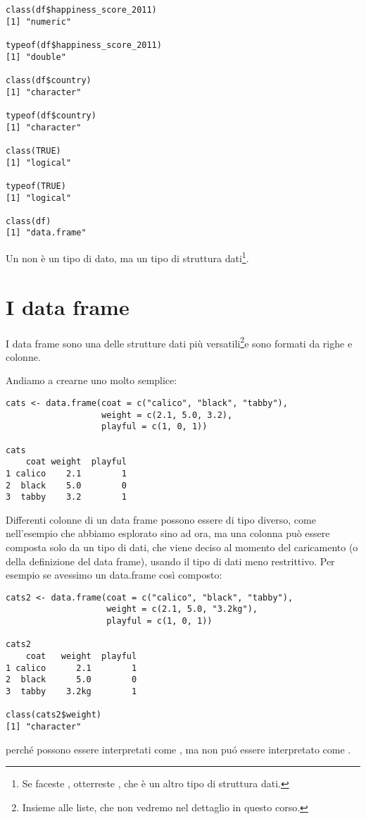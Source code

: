 \begin{lstlisting}[style=Rstyle]	
class(df$happiness_score_2011)
[1] "numeric"

typeof(df$happiness_score_2011)
[1] "double"

class(df$country)
[1] "character"

typeof(df$country)
[1] "character"

class(TRUE)
[1] "logical"

typeof(TRUE)
[1] "logical"

class(df)
[1] "data.frame"
\end{lstlisting}
%
Un  non \`e un tipo di dato, ma un tipo di struttura dati\footnote{Se faceste , otterreste , che \`e un altro tipo di struttura dati.}.

\section{I data frame}

I data frame sono una delle strutture dati pi\`u versatili\footnote{Insieme alle liste, che non vedremo nel dettaglio in questo corso.}e sono formati da righe e colonne.

\noindent Andiamo a crearne uno molto semplice:

\begin{lstlisting}[style=Rstyle]
cats <- data.frame(coat = c("calico", "black", "tabby"),
                   weight = c(2.1, 5.0, 3.2),
                   playful = c(1, 0, 1))
				   
cats					
    coat weight  playful
1 calico    2.1        1
2  black    5.0        0
3  tabby    3.2        1
\end{lstlisting}

\vspace{0.2cm}

\noindent Differenti colonne di un data frame possono essere di tipo diverso, come nell'esempio che abbiamo esplorato sino ad ora, ma una colonna pu\`o essere composta solo da un tipo di dati, che viene deciso al momento del caricamento (o della definizione del data frame), usando il tipo di dati meno restrittivo. Per esempio se avessimo un data.frame cos\`i composto:

\begin{lstlisting}[style=Rstyle]	
cats2 <- data.frame(coat = c("calico", "black", "tabby"),
                    weight = c(2.1, 5.0, "3.2kg"),
                    playful = c(1, 0, 1))	
	
cats2
    coat   weight  playful
1 calico      2.1        1
2  black      5.0        0
3  tabby    3.2kg        1

class(cats2$weight)
[1] "character"
\end{lstlisting}
%
perch\'e  possono essere interpretati come , ma  non pu\'o essere interpretato come .

